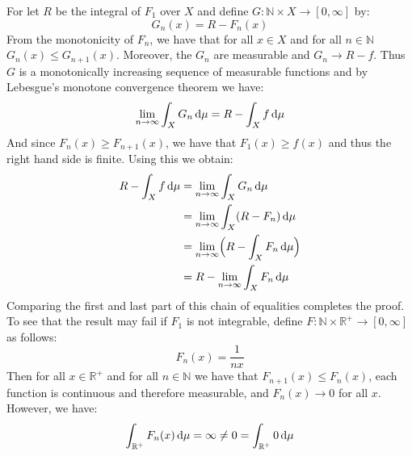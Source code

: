 \documentclass[crop=false,class=article]{standalone}                           %
\begin{document}
        \begin{solution}
            For let $R$ be the integral of $F_{1}$ over $X$ and define
            $G:\mathbb{N}\times{X}\rightarrow[0,\infty]$ by:
            \begin{equation}
                G_{n}(x)=R-F_{n}(x)
            \end{equation}
            From the monotonicity of $F_{n}$, we have that for all $x\in{X}$ and
            for all $n\in\mathbb{N}$ $G_{n}(x)\leq{G}_{n+1}(x)$. Moreover, the
            $G_{n}$ are measurable and $G_{n}\rightarrow{R}-f$. Thus $G$ is a
            monotonically increasing sequence of measurable functions and by
            Lebesgue's monotone convergence theorem we have:
            \begin{equation}
                \underset{n\rightarrow\infty}{\lim}\int_{X}G_{n}\mathop{}\!\mathrm{d}{\mu}
                =R-\int_{X}f\mathop{}\!\mathrm{d}{\mu}
            \end{equation}
            And since $F_{n}(x)\geq{F}_{n+1}(x)$, we have that
            $F_{1}(x)\geq{f}(x)$ and thus the right hand side is finite. Using
            this we obtain:
            \begin{align}
                R-\int_{X}f\mathop{}\!\mathrm{d}{\mu}
                &=\underset{n\rightarrow\infty}{\lim}\int_{X}G_{n}\mathop{}\!\mathrm{d}{\mu}\\
                &=\underset{n\rightarrow\infty}{\lim}
                    \int_{X}(R-F_{n})\mathop{}\!\mathrm{d}{\mu}\\
                &=\underset{n\rightarrow\infty}{\lim}
                    \Big(R-\int_{X}F_{n}\mathop{}\!\mathrm{d}{\mu}\Big)\\
                &=R-\underset{n\rightarrow\infty}{\lim}\int_{X}F_{n}\mathop{}\!\mathrm{d}{\mu}
            \end{align}
            Comparing the first and last part of this chain of equalities
            completes the proof. To see that the result may fail if $F_{1}$ is
            not integrable, define
            $F:\mathbb{N}\times\mathbb{R}^{+}\rightarrow[0,\infty]$ as follows:
            \begin{equation}
                F_{n}(x)=\frac{1}{nx}
            \end{equation}
            Then for all $x\in\mathbb{R}^{+}$ and for all $n\in\mathbb{N}$ we
            have that $F_{n+1}(x)\leq{F}_{n}(x)$, each function is continuous
            and therefore measurable, and $F_{n}(x)\rightarrow{0}$ for all $x$.
            However, we have:
            \begin{equation}
                \int_{\mathbb{R}^{+}}F_{n}(x)\mathop{}\!\mathrm{d}{\mu}
                =\infty\ne{0}
                =\int_{\mathbb{R}^{+}}0\mathop{}\!\mathrm{d}{\mu}
            \end{equation}
        \end{solution}
\end{document}
